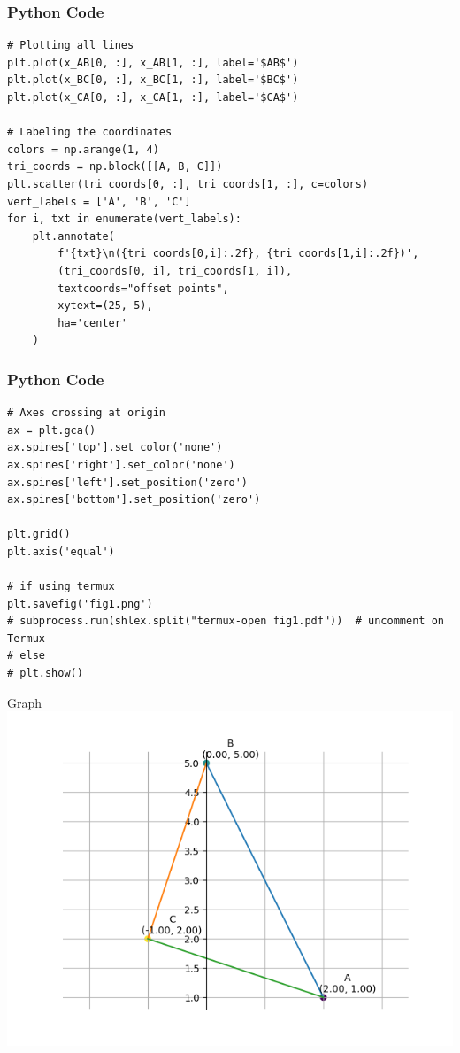 \documentclass{beamer}
\begin{document}
\begin{frame}[fragile]
    \frametitle{Python Code}
    \begin{lstlisting}
# Plotting all lines
plt.plot(x_AB[0, :], x_AB[1, :], label='$AB$')
plt.plot(x_BC[0, :], x_BC[1, :], label='$BC$')
plt.plot(x_CA[0, :], x_CA[1, :], label='$CA$')

# Labeling the coordinates
colors = np.arange(1, 4)
tri_coords = np.block([[A, B, C]])
plt.scatter(tri_coords[0, :], tri_coords[1, :], c=colors)
vert_labels = ['A', 'B', 'C']
for i, txt in enumerate(vert_labels):
    plt.annotate(
        f'{txt}\n({tri_coords[0,i]:.2f}, {tri_coords[1,i]:.2f})',
        (tri_coords[0, i], tri_coords[1, i]),
        textcoords="offset points",
        xytext=(25, 5),
        ha='center'
    )
    \end{lstlisting}
\end{frame}

\begin{frame}[fragile]
\frametitle{Python Code}
\begin{lstlisting}
# Axes crossing at origin
ax = plt.gca()
ax.spines['top'].set_color('none')
ax.spines['right'].set_color('none')
ax.spines['left'].set_position('zero')
ax.spines['bottom'].set_position('zero')

plt.grid()
plt.axis('equal')

# if using termux
plt.savefig('fig1.png')
# subprocess.run(shlex.split("termux-open fig1.pdf"))  # uncomment on Termux
# else
# plt.show()
\end{lstlisting}
    
\end{frame}

\begin{frame}{Graph}
   \centering
    \includegraphics[width=\columnwidth, height=0.8\textheight, keepaspectratio]{figs/fig1.png}
    \label{fig:Beamer/figs/fig1.png}
\end{frame}
\end{document}
